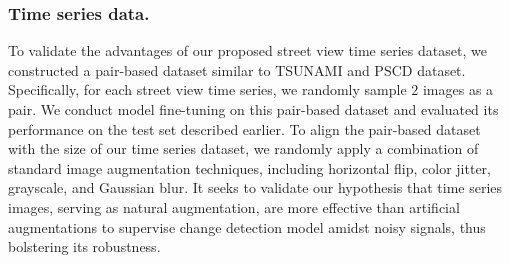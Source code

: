 \documentclass[letterpaper]{article} %
\begin{document}
\subsubsection{Time series data.}
To validate the advantages of our proposed street view time series dataset, we constructed a pair-based dataset similar to TSUNAMI \cite{Sakurada2015ChangeDF} and PSCD \cite{sakurada2020weakly} dataset. Specifically, for each street view time series, we randomly sample $2$ images as a pair. We conduct model fine-tuning on this pair-based dataset and evaluated its performance on the test set described earlier.
To align the pair-based dataset with the size of our time series dataset, we randomly apply a combination of standard image augmentation techniques, including horizontal flip, color jitter, grayscale, and Gaussian blur. It seeks to validate our hypothesis that time series images, serving as natural augmentation, are more effective than artificial augmentations to supervise change detection model amidst noisy signals, thus bolstering its robustness.

\end{document}
